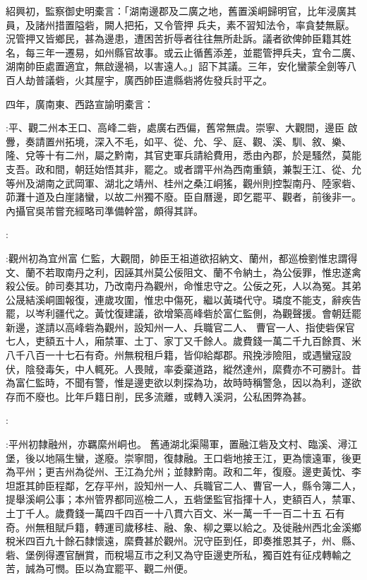 \begin{pinyinscope}
 紹興初，監察御史明橐言：「湖南邊郡及二廣之地，舊置溪峒歸明官，比年浸廣其員，及諸州措置隘砦，闕人把拓，又令管押
 兵夫，素不習知法令，率貪婪無厭。況管押又皆鄉民，甚為邊患，遭困苦折辱者往往無所赴訴。議者欲俾帥臣籍其姓名，每三年一遷易，如州縣官故事。或云止循舊添差，並罷管押兵夫，宜令二廣、湖南帥臣處置適宜，無啟邊禍，以害遠人。」詔下其議。三年，安化蠻蒙全劍等八百人劫普議砦，火其屋宇，廣西帥臣遣縣砦將佐發兵討平之。



 四年，廣南東、西路宣諭明橐言：



 :平、觀二州本王口、高峰二砦，處廣右西偏，舊常無虞。崇寧、大觀間，邊臣
 啟釁，奏請置州拓境，深入不毛，如平、從、允、孚、庭、觀、溪、馴、敘、樂、隆、兌等十有二州，屬之黔南，其官吏軍兵請給費用，悉由內郡，於是騷然，莫能支吾。政和間，朝廷始悟其非，罷之。或者謂平州為西南重鎮，兼製王江、從、允等州及湖南之武岡軍、湖北之靖州、桂州之桑江峒猺，觀州則控製南丹、陸家砦、茆灘十道及白崖諸蠻，以故二州獨不廢。臣自曆邊，即乞罷平、觀者，前後非一。內攝官吳芾嘗充經略司準備幹當，頗得其詳。



 :



 :觀州初為宜州富
 仁監，大觀間，帥臣王祖道欲招納文、蘭州，都巡檢劉惟忠謂得文、蘭不若取南丹之利，因誣其州莫公佞阻文、蘭不令納土，為公佞罪，惟忠遂禽殺公佞。帥司奏其功，乃改南丹為觀州，命惟忠守之。公佞之死，人以為冤。其弟公晟結溪峒圖報復，連歲攻圍，惟忠中傷死，繼以黃璘代守。璘度不能支，辭疾告罷，以岑利疆代之。黃忱復建議，欲增築高峰砦於富仁監側，為觀聲援。會朝廷罷新邊，遂請以高峰砦為觀州，設知州一人、兵職官二人、
 曹官一人、指使砦保官七人，吏額五十人，廂禁軍、土丁、家丁又千餘人。歲費錢一萬二千九百餘貫、米八千八百一十七石有奇。州無稅租戶籍，皆仰給鄰郡。飛挽涉險阻，或遇蠻寇設伏，陰發毒矢，中人輒死。人畏賊，率委棄道路，縱然達州，縻費亦不可勝計。昔為富仁監時，不聞有警，惟是邊吏欲以刺探為功，故時時稱警急，因以為利，遂欲存而不廢也。比年戶籍日削，民多流離，或轉入溪洞，公私困弊為甚。



 :



 :平州初隸融州，亦羈縻州峒也。
 舊通湖北渠陽軍，置融江砦及文村、臨溪、潯江堡，後以地隔生蠻，遂廢。崇寧間，復隸融。王口砦地接王江，更為懷遠軍，後更為平州；更吉州為從州、王江為允州；並隸黔南。政和二年，復廢。邊吏黃忱、李坦誑其帥臣程鄰，乞存平州，設知州一人、兵職官二人、曹官一人，縣令簿二人，提舉溪峒公事；本州管界都同巡檢二人，五砦堡監官指揮十人，吏額百人，禁軍、土丁千人。歲費錢一萬四千四百一十八貫六百文、米一萬一千一百二十五
 石有奇。州無租賦戶籍，轉運司歲移桂、融、象、柳之粟以給之。及徙融州西北金溪鄉稅米四百九十餘石隸懷遠，縻費甚於觀州。況守臣到任，即奏推恩其子，州、縣、砦、堡例得遷官酬賞，而稅場互市之利又為守臣邊吏所私，獨百姓有征戍轉輸之苦，誠為可憫。臣以為宜罷平、觀二州便。




\end{pinyinscope}
